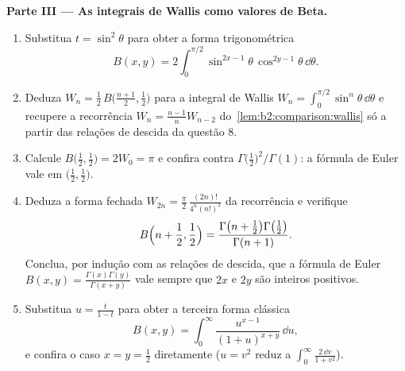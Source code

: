 \begin{problem}
\medskip
\noindent\textbf{Parte III --- As integrais de Wallis como valores de Beta.}
\begin{enumerate}[resume]
  \item Substitua $t = \sin^2\theta$ para obter a forma
        trigonométrica
        \[
        B(x, y) = 2\int_0^{\pi/2}
        \sin^{2x-1}\theta\,\cos^{2y-1}\theta\,\dd\theta .
        \]
  \item Deduza $W_n = \frac12\,B\bigl(\frac{n+1}2, \frac12\bigr)$
        para a integral de Wallis $W_n = \int_0^{\pi/2}\sin^n
        \theta\,\dd\theta$ e recupere a recorrência $W_n =
        \frac{n-1}{n}W_{n-2}$ do~\cref{lem:b2:comparison:wallis}
        só a partir das relações de descida da questão 8.
  \item Calcule $B\bigl(\frac12, \frac12\bigr) = 2W_0 = \pi$ e
        confira contra $\Gamma\bigl(\frac12\bigr)^2/\Gamma(1)$:
        a fórmula de Euler vale em $\bigl(\frac12,
        \frac12\bigr)$.
  \item Deduza a forma fechada $W_{2n} = \frac\pi2\,
        \frac{(2n)!}{4^n(n!)^2}$ da recorrência e verifique
        \[
        B\Bigl(n + \frac12, \frac12\Bigr)
        = \frac{\Gamma\bigl(n + \frac12\bigr)\Gamma\bigl(
        \frac12\bigr)}{\Gamma(n+1)} .
        \]
        Conclua, por indução com as relações de descida, que
        a fórmula de Euler $B(x,y) =
        \frac{\Gamma(x)\Gamma(y)}{\Gamma(x+y)}$ vale sempre que
        $2x$ e $2y$ são inteiros positivos.
  \item Substitua $u = \frac{t}{1-t}$ para obter a terceira
        forma clássica
        \[
        B(x,y) = \int_0^\infty
        \frac{u^{x-1}}{(1+u)^{x+y}}\,\dd u ,
        \]
        e confira o caso $x = y = \frac12$ diretamente ($u = v^2$
        reduz a $\int_0^\infty\frac{2\,\dd v}{1+v^2}$).
\end{enumerate}


\end{problem}
